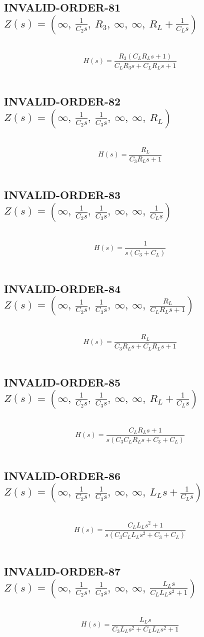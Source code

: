 \documentclass{article}
\begin{document}
\subsection{INVALID-ORDER-81 $Z(s) = \left( \infty, \  \frac{1}{C_{2} s}, \  R_{3}, \  \infty, \  \infty, \  R_{L} + \frac{1}{C_{L} s}\right)$ } \ 
\textbf{\[H(s) = \frac{R_{3} \left(C_{L} R_{L} s + 1\right)}{C_{L} R_{3} s + C_{L} R_{L} s + 1}\] } \ 
\subsection{INVALID-ORDER-82 $Z(s) = \left( \infty, \  \frac{1}{C_{2} s}, \  \frac{1}{C_{3} s}, \  \infty, \  \infty, \  R_{L}\right)$ } \ 
\textbf{\[H(s) = \frac{R_{L}}{C_{3} R_{L} s + 1}\] } \ 
\subsection{INVALID-ORDER-83 $Z(s) = \left( \infty, \  \frac{1}{C_{2} s}, \  \frac{1}{C_{3} s}, \  \infty, \  \infty, \  \frac{1}{C_{L} s}\right)$ } \ 
\textbf{\[H(s) = \frac{1}{s \left(C_{3} + C_{L}\right)}\] } \ 
\subsection{INVALID-ORDER-84 $Z(s) = \left( \infty, \  \frac{1}{C_{2} s}, \  \frac{1}{C_{3} s}, \  \infty, \  \infty, \  \frac{R_{L}}{C_{L} R_{L} s + 1}\right)$ } \ 
\textbf{\[H(s) = \frac{R_{L}}{C_{3} R_{L} s + C_{L} R_{L} s + 1}\] } \ 
\subsection{INVALID-ORDER-85 $Z(s) = \left( \infty, \  \frac{1}{C_{2} s}, \  \frac{1}{C_{3} s}, \  \infty, \  \infty, \  R_{L} + \frac{1}{C_{L} s}\right)$ } \ 
\textbf{\[H(s) = \frac{C_{L} R_{L} s + 1}{s \left(C_{3} C_{L} R_{L} s + C_{3} + C_{L}\right)}\] } \ 
\subsection{INVALID-ORDER-86 $Z(s) = \left( \infty, \  \frac{1}{C_{2} s}, \  \frac{1}{C_{3} s}, \  \infty, \  \infty, \  L_{L} s + \frac{1}{C_{L} s}\right)$ } \ 
\textbf{\[H(s) = \frac{C_{L} L_{L} s^{2} + 1}{s \left(C_{3} C_{L} L_{L} s^{2} + C_{3} + C_{L}\right)}\] } \ 
\subsection{INVALID-ORDER-87 $Z(s) = \left( \infty, \  \frac{1}{C_{2} s}, \  \frac{1}{C_{3} s}, \  \infty, \  \infty, \  \frac{L_{L} s}{C_{L} L_{L} s^{2} + 1}\right)$ } \ 
\textbf{\[H(s) = \frac{L_{L} s}{C_{3} L_{L} s^{2} + C_{L} L_{L} s^{2} + 1}\] } \ 
\end{document}
